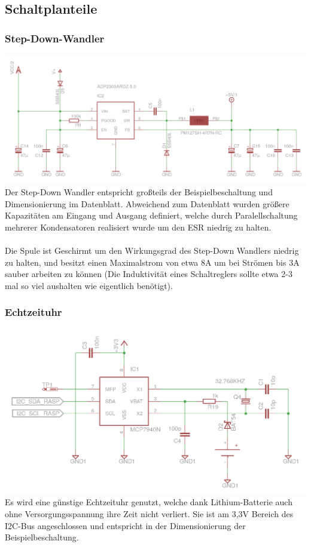 \documentclass[a4paper,10pt]{article}
\begin{document}
\subsection{Schaltplanteile}

\subsubsection{Step-Down-Wandler}

\includegraphics[width=\textwidth]{circuit_step-down} \\
Der Step-Down Wandler entspricht großteils der Beispielbeschaltung und Dimensionierung im Datenblatt. Abweichend zum Datenblatt wurden größere Kapazitäten am Eingang und Ausgang definiert, welche durch Paralellschaltung mehrerer Kondensatoren realisiert wurde um den ESR niedrig zu halten. \\\\
Die Spule ist Geschirmt um den Wirkungsgrad des Step-Down Wandlers niedrig zu halten, und besitzt einen Maximalstrom von etwa 8A um bei Strömen bis 3A sauber arbeiten zu können (Die Induktivität eines Schaltreglers sollte etwa 2-3 mal so viel aushalten wie eigentlich benötigt).

\subsubsection{Echtzeituhr}

\includegraphics[width=\textwidth]{circuit_rtc} \\
Es wird eine günstige Echtzeituhr genutzt, welche dank Lithium-Batterie auch ohne Versorgungsspannung ihre Zeit nicht verliert. Sie ist am 3,3V Bereich des I2C-Bus angeschlossen und entspricht in der Dimensionierung der Beispielbeschaltung.
\end{document}
